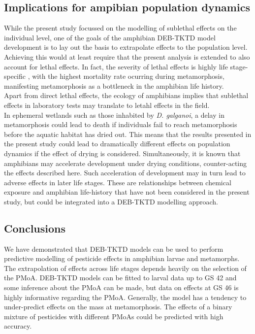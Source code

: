 \documentclass[preprint,12pt]{elsarticle}
\begin{document}
\subsection{Implications for ampibian population dynamics}
\noindent
While the present study focussed on the modelling of sublethal effects on the individual level, 
one of the goals of the amphibian DEB-TKTD model development is to lay out the basis to extrapolate effects to the population level.
Achieving this would at least require that the present analysis is extended to also account for lethal effects. 
In fact, the severity of lethal effects is highly life stage-specific \citep{gonzalez-lopezChronicExposurePesticides2026}, 
with the highest mortality rate ocurring during metamorphosis, 
manifesting metamorphosis as a bottleneck in the amphibian life history.\\ 
Apart from direct lethal effects, the ecology of amphibians implies that sublethal effects in laboratory tests 
may translate to letahl effects in the field.\\
In ephemeral wetlands such as those inhabited by \textit{D. galganoi},
a delay in metamorphosis could lead to death if individuals fail to reach metamorphosis 
before the aquatic habitat has dried out. 
This means that the results presented in the present study could lead 
to dramatically different effects on population dynamics if the effect of drying is considered. 
Simultaneously, it is known that amphibians may accelerate development under drying conditions, 
counter-acting the effects described here. 
Such acceleration of development may in turn lead to adverse effects in later life stages. 
These are relationships between chemical exposure and amphibian life-history that have not been considered 
in the present study, but could be integrated into a DEB-TKTD modelling approach.
%
\subsection{Conclusions}
\noindent 
We have demonstrated that DEB-TKTD models can be used to perform predictive modelling 
of pesticide effects in amphibian larvae and metamorphs.
The extrapolation of effects across life stages depends heavily on the selection of the PMoA. 
DEB-TKTD models can be fitted to larval data up to GS 42 and some inference about the PMoA can be made, 
but data on effects at GS 46 is highly informative regarding the PMoA.
Generally, the model has a tendency to under-predict effects on the mass at metamorphosis. 
The effects of a binary mixture of pesticides with different PMoAs could be predicted with high accuracy.
\end{document}
